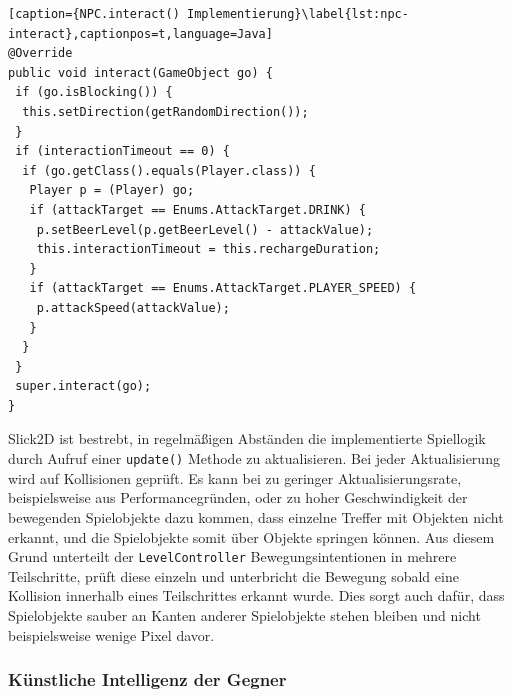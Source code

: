 \begin{lstlisting}[caption={NPC.interact() Implementierung}\label{lst:npc-interact},captionpos=t,language=Java]
@Override
public void interact(GameObject go) {
 if (go.isBlocking()) {
  this.setDirection(getRandomDirection());
 }
 if (interactionTimeout == 0) {
  if (go.getClass().equals(Player.class)) {
   Player p = (Player) go;
   if (attackTarget == Enums.AttackTarget.DRINK) {
    p.setBeerLevel(p.getBeerLevel() - attackValue);
    this.interactionTimeout = this.rechargeDuration;
   }
   if (attackTarget == Enums.AttackTarget.PLAYER_SPEED) {
    p.attackSpeed(attackValue);
   }
  }
 }
 super.interact(go);
}

\end{lstlisting}

Slick2D ist bestrebt, in regelmäßigen Abständen die implementierte Spiellogik durch Aufruf einer \texttt{update()} Methode zu aktualisieren.
Bei jeder Aktualisierung wird auf Kollisionen geprüft.
Es kann bei zu geringer Aktualisierungsrate, beispielsweise aus Performancegründen, oder zu hoher Geschwindigkeit der bewegenden Spielobjekte dazu kommen, dass einzelne Treffer mit Objekten nicht erkannt, und die Spielobjekte somit über Objekte springen können.
Aus diesem Grund unterteilt der \texttt{LevelController} Bewegungsintentionen in mehrere Teilschritte, prüft diese einzeln und unterbricht die Bewegung sobald eine Kollision innerhalb eines Teilschrittes erkannt wurde.
Dies sorgt auch dafür, dass Spielobjekte sauber an Kanten anderer Spielobjekte stehen bleiben und nicht beispielsweise wenige Pixel davor.


\subsubsection{Künstliche Intelligenz der Gegner}
